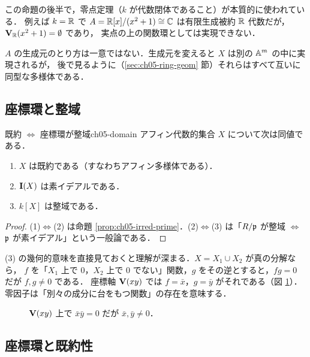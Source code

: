 この命題の後半で，零点定理（$k$ が代数閉体であること）が本質的に使われている．
例えば $k=\mathbb{R}$ で $A=\mathbb{R}[x]/(x^2+1)\cong\mathbb{C}$ は有限生成被約 $\mathbb{R}$ 代数だが，$\mathbf{V}_{\mathbb{R}}(x^2+1)=\emptyset$ であり，
実点の上の関数環としては実現できない．

$A$ の生成元のとり方は一意ではない．生成元を変えると $X$ は別の $\mathbb{A}^m$ の中に実現されるが，
後で見るように（\ref{sec:ch05-ring-geom} 節）それらはすべて互いに同型な多様体である．

\subsection{座標環と整域}

\begin{myprop}{既約 $\iff$ 座標環が整域}{ch05-domain}
アフィン代数的集合 $X$ について次は同値である．
\begin{enumerate}
  \item $X$ は既約である（すなわちアフィン多様体である）．
  \item $\mathbf{I}(X)$ は素イデアルである．
  \item $k[X]$ は整域である．
\end{enumerate}
\end{myprop}

\begin{proof}
(1)$\iff$(2) は命題 \ref{prop:ch05-irred-prime}．(2)$\iff$(3) は「$R/\mathfrak{p}$ が整域 $\iff$ $\mathfrak{p}$ が素イデアル」という一般論である．
\end{proof}

(3) の幾何的意味を直接見ておくと理解が深まる．$X=X_1\cup X_2$ が真の分解なら，
$f$ を「$X_1$ 上で $0$，$X_2$ 上で $0$ でない」関数，$g$ をその逆とすると，$fg=0$ だが $f,g\ne0$ である．
座標軸 $\mathbf{V}(xy)$ では $f=\bar x$，$g=\bar y$ がそれである（図 \ref{fig:ch05-zero-div}）．
零因子は「別々の成分に台をもつ関数」の存在を意味する．

\begin{figure}[H]
\centering
{}
\caption{$\mathbf{V}(xy)$ 上で $\bar x\bar y=0$ だが $\bar x,\bar y\neq0$．}
\label{fig:ch05-zero-div}
\end{figure}

\subsection{座標環と既約性}

